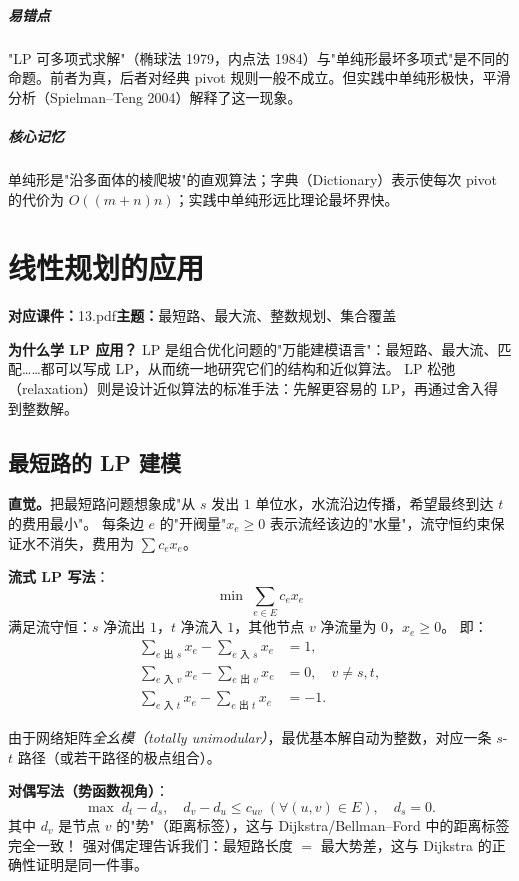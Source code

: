 \documentclass[UTF8,openany,12pt]{ctexbook}
\theoremstyle{remark}
\newcommand{\lecture}[3]{
  \chapter{#2}
  \noindent\textbf{对应课件：}#1\hfill\textbf{主题：}#3
  \vspace{0.6em}
}
\newcommand{\keypoint}[1]{\paragraph{核心记忆}#1}
\newcommand{\pitfall}[1]{\paragraph{易错点}#1}
\begin{document}
\pitfall{"LP 可多项式求解"（椭球法 1979，内点法 1984）与"单纯形最坏多项式"是不同的命题。前者为真，后者对经典 pivot 规则一般不成立。但实践中单纯形极快，平滑分析（Spielman--Teng 2004）解释了这一现象。}

\keypoint{单纯形是"沿多面体的棱爬坡"的直观算法；字典（Dictionary）表示使每次 pivot 的代价为 $O((m+n)n)$；实践中单纯形远比理论最坏界快。}


\lecture{13.pdf}{线性规划的应用}{最短路、最大流、整数规划、集合覆盖}

\noindent
\textbf{为什么学 LP 应用？}
LP 是组合优化问题的"万能建模语言"：最短路、最大流、匹配……都可以写成 LP，从而统一地研究它们的结构和近似算法。
LP 松弛（relaxation）则是设计近似算法的标准手法：先解更容易的 LP，再通过舍入得到整数解。

\section{最短路的 LP 建模}

\noindent\textbf{直觉。}把最短路问题想象成"从 $s$ 发出 $1$ 单位水，水流沿边传播，希望最终到达 $t$ 的费用最小"。
每条边 $e$ 的"开阀量"$x_e\ge0$ 表示流经该边的"水量"，流守恒约束保证水不消失，费用为 $\sum c_e x_e$。

\noindent\textbf{流式 LP 写法}：
\[
  \min\;\sum_{e\in E}c_e x_e
\]
满足流守恒：$s$ 净流出 $1$，$t$ 净流入 $1$，其他节点 $v$ 净流量为 $0$，$x_e\ge0$。
即：
\begin{align*}
  \sum_{e\text{ 出 }s}x_e - \sum_{e\text{ 入 }s}x_e &= 1, \\
  \sum_{e\text{ 入 }v}x_e - \sum_{e\text{ 出 }v}x_e &= 0,\quad v\ne s,t, \\
  \sum_{e\text{ 入 }t}x_e - \sum_{e\text{ 出 }t}x_e &= -1.
\end{align*}

由于网络矩阵\emph{全幺模（totally unimodular）}，最优基本解自动为整数，对应一条 $s$-$t$ 路径（或若干路径的极点组合）。

\noindent\textbf{对偶写法（势函数视角）}：
\[
  \max\;d_t - d_s,\quad d_v - d_u\le c_{uv}\;(\forall (u,v)\in E),\quad d_s=0.
\]
其中 $d_v$ 是节点 $v$ 的"势"（距离标签），这与 Dijkstra/Bellman--Ford 中的距离标签完全一致！
强对偶定理告诉我们：最短路长度 $=$ 最大势差，这与 Dijkstra 的正确性证明是同一件事。

\end{document}
